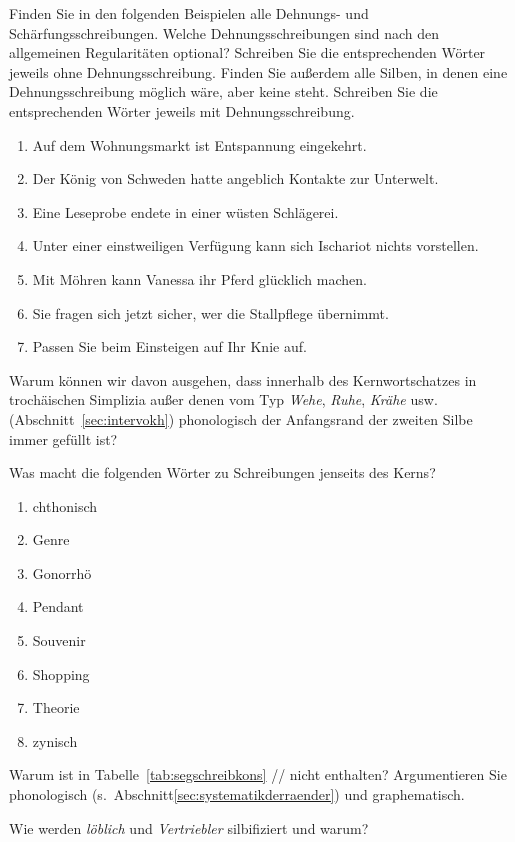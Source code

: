 \Uebung \label{u144} Finden Sie in den folgenden Beispielen alle Dehnungs- und Schärfungsschreibungen.
Welche Dehnungsschreibungen sind nach den allgemeinen Regularitäten optional?
Schreiben Sie die entsprechenden Wörter jeweils ohne Dehnungsschreibung.
Finden Sie außerdem alle Silben, in denen eine Dehnungsschreibung möglich wäre, aber keine steht.
Schreiben Sie die entsprechenden Wörter jeweils mit Dehnungsschreibung.

\begin{enumerate}\Lf
  \item Auf dem Wohnungsmarkt ist Entspannung eingekehrt.
  \item Der König von Schweden hatte angeblich Kontakte zur Unterwelt.
  \item Eine Leseprobe endete in einer wüsten Schlägerei.
  \item Unter einer einstweiligen Verfügung kann sich Ischariot nichts vorstellen.
  \item Mit Möhren kann Vanessa ihr Pferd glücklich machen.
  \item Sie fragen sich jetzt sicher, wer die Stallpflege übernimmt.
  \item Passen Sie beim Einsteigen auf Ihr Knie auf. 
\end{enumerate}

\Uebung[\tristar] \label{u145} Warum können wir davon ausgehen, dass innerhalb des Kernwortschatzes in trochäischen Simplizia außer denen vom Typ \textit{Wehe}, \textit{Ruhe}, \textit{Krähe} usw. (Abschnitt~\ref{sec:intervokh}) phonologisch der Anfangsrand der zweiten Silbe immer gefüllt ist?

\Uebung \label{u146} Was macht die folgenden Wörter zu Schreibungen jenseits des Kerns?

\begin{enumerate}\Lf
  \item chthonisch
  \item Genre
  \item Gonorrhö
  \item Pendant
  \item Souvenir
  \item Shopping
  \item Theorie
  \item zynisch
\end{enumerate}

\Uebung[\tristar] \label{u147} Warum ist in Tabelle~\ref{tab:segschreibkons} // nicht enthalten?
Argumentieren Sie phonologisch (s.\ Abschnitt\ref{sec:systematikderraender}) und graphematisch.

\Uebung[\tristar] \label{u148} Wie werden \textit{löblich} und \textit{Vertriebler} silbifiziert und warum?

